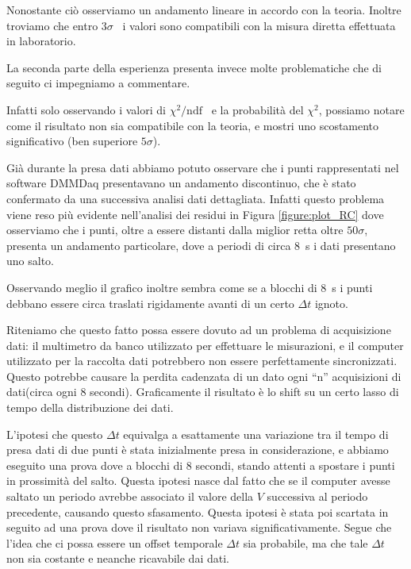 \documentclass[
    reprint, 
    superscriptaddress, 
    altaffilletter, 
    amsmath, 
    amssymb, 
    a4paper
]{revtex4-2}
\newcommand{\reffig}[1]{Figura {\ref{#1}}}%
\newcommand{\ChiSqr}{$\chi^2$\space}
\newcommand{\ChiNdf}{$\chi^2/\text{ndf}$}
\newcommand{\treSigma}{$3\sigma$}
\begin{document}
    Nonostante ciò osserviamo un andamento lineare in accordo con la teoria.
    Inoltre troviamo che entro \treSigma~ i valori sono compatibili con la misura diretta effettuata in laboratorio.
    
    La seconda parte della esperienza presenta invece molte problematiche che di seguito ci impegniamo a commentare.
    
    Infatti solo osservando i valori di \ChiNdf~ e la probabilità del \ChiSqr, possiamo notare come il risultato non sia compatibile con la teoria, e mostri uno scostamento significativo (ben superiore $5\sigma$).
    
    Già durante la presa dati abbiamo potuto osservare che i punti rappresentati nel software DMMDaq presentavano un andamento discontinuo, che è stato confermato da una successiva analisi dati dettagliata. Infatti questo problema viene reso più evidente nell'analisi dei residui in \reffig{figure:plot_RC} dove osserviamo che i punti, oltre a essere distanti dalla miglior retta oltre $50\sigma$, presenta un andamento particolare, dove a periodi di circa 8~s i dati presentano uno salto.
    
    Osservando meglio il grafico inoltre sembra come se a blocchi di 8~s i punti debbano essere circa traslati rigidamente avanti di un certo $\Delta t$ ignoto.
    
    Riteniamo che questo fatto possa essere dovuto ad un problema di acquisizione dati: il multimetro da banco  utilizzato per effettuare le misurazioni, e il computer utilizzato per la raccolta dati potrebbero non essere perfettamente sincronizzati. Questo potrebbe causare la perdita cadenzata di un dato ogni “n” acquisizioni di dati(circa ogni 8 secondi). Graficamente il risultato è lo shift su un certo lasso di tempo della distribuzione dei dati.
    
    L'ipotesi che questo $\Delta t$ equivalga a esattamente una variazione tra il tempo di presa dati di due punti è stata inizialmente presa in considerazione, e abbiamo eseguito una prova dove a blocchi di 8 secondi, stando attenti a spostare i punti in prossimità del salto. Questa ipotesi nasce dal fatto che se il computer avesse saltato un periodo avrebbe associato il valore della $V$ successiva al periodo precedente, causando questo sfasamento. Questa ipotesi è stata poi scartata in seguito ad una prova dove il risultato non variava significativamente. Segue che l'idea che ci possa essere un offset temporale $\Delta t$ sia probabile, ma che tale $\Delta t$ non sia costante e neanche ricavabile dai dati.
    
\end{document}
